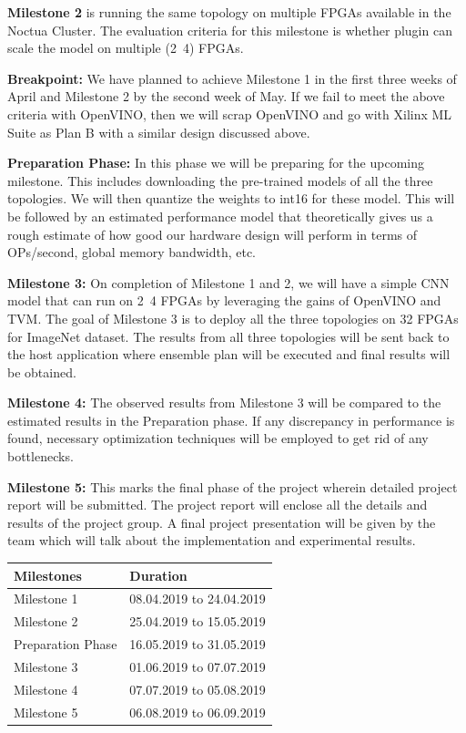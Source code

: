 \documentclass[titlepage]{report}
\begin{document}
\textbf{Milestone 2} is running the same topology on multiple FPGAs available in the Noctua Cluster. The evaluation criteria for this milestone is whether plugin can scale the model on multiple (2~4) FPGAs.

\textbf{Breakpoint:} We have planned to achieve Milestone 1 in the first three weeks of April and Milestone 2 by the second week of May. If we fail to meet the above criteria with OpenVINO, then we will scrap OpenVINO and go with Xilinx ML Suite as Plan B with a similar design discussed above. 

\textbf{Preparation Phase:} In this phase we will be preparing for the upcoming milestone. This includes downloading the pre-trained models of all the three topologies. We will then quantize the weights to int16 for these model. This will be followed by an estimated performance model that theoretically gives us a rough estimate of how good our hardware design will perform in terms of OPs/second, global memory bandwidth, etc.

\textbf{Milestone 3:} On completion of Milestone 1 and 2, we will have a simple CNN model that can run on 2~4 FPGAs by leveraging the gains of OpenVINO and TVM. The goal of Milestone 3 is to deploy all the three topologies on 32 FPGAs for ImageNet dataset. The results from all three topologies will be sent back to the host application where ensemble plan will be executed and final results will be obtained.

\textbf{Milestone 4:} The observed results from Milestone 3 will be compared to the estimated results in the Preparation phase. If any discrepancy in performance is found, necessary optimization techniques will be employed to get rid of any bottlenecks.

\textbf{Milestone 5:} This marks the final phase of the project wherein detailed project report will be submitted. The project report will enclose all the details and results of the project group. A final project presentation will be given by the team which will talk about the implementation and experimental results.

\begin{table}[]
\begin{tabular}{|l|l|}
\hline
\textbf{Milestones}                   & \textbf{Duration}                  \\ \hline
Milestone 1                 & 08.04.2019 to 24.04.2019 \\ \hline
Milestone 2                 & 25.04.2019 to 15.05.2019 \\ \hline
Preparation Phase & 16.05.2019 to 31.05.2019 \\ \hline
Milestone 3                 & 01.06.2019 to 07.07.2019 \\ \hline
Milestone 4                 & 07.07.2019 to 05.08.2019 \\ \hline
Milestone 5                 & 06.08.2019 to 06.09.2019 \\ \hline
\end{tabular}
\end{table}
\end{document}
